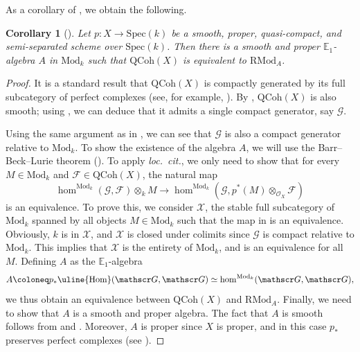 \documentclass[oneside, hidelinks, 12pt, a4paper,reqno]{amsart}
\theoremstyle{plain}
\theoremstyle{definition}
\theoremstyle{plain}
\newtheorem{corollary}[corollary]{Corollary}
\newcommand{\cF}{\mathscr F}
\newcommand{\cG}{\mathscr G}
\newcommand{\cO}{\mathscr O}
\newcommand{\cX}{\mathscr X}
\newcommand{\Spec}{\mathrm{Spec}}
\newcommand{\Qcoh}{\mathrm{QCoh}}
\newcommand{\Hom}{\mathrm{Hom}}
\newcommand{\Mod}{\mathrm{Mod}}
\newcommand{\RMod}{\mathrm{RMod}}
\begin{document}
As a corollary of , we obtain the following.

\begin{corollary}[{\cite{bondal2002generatorsrepresentabilityfunctorscommutative, toen2011derivedazumayaalgebrasgenerators}}]\label{cor: non commutative algebra in alg geo}
    Let $p\colon X \to \Spec(k)$ be a smooth, proper, quasi-compact, and semi-separated scheme over $\Spec(k)$. Then there is a smooth and proper $\mathbb{E}_{1}$-algebra $A$ in $\Mod_{k}$ such that $\Qcoh(X)$ is equivalent to $\mathrm{RMod}_{A}$.
\end{corollary}

\begin{proof}
    It is a standard result that $\Qcoh(X)$ is compactly generated by its full subcategory of perfect complexes (see, for example, \cite[Theorem 8.3]{scholze2025sixfunctorformalisms}). By , $\Qcoh(X)$ is also smooth; using \cite[Proposition 11.3.2.4]{SAG}, we can deduce that it admits a single compact generator, say $\cG$. 
    
    Using the same argument as in , we can see that $\cG$ is also a compact generator relative to $\Mod_{k}$. To show the existence of the algebra $A$, we will use the Barr--Beck--Lurie theorem (\cite[Proposition 4.8.5.8]{HA}). To apply \textit{loc.\ cit.}, we only need to show that for every $M \in \Mod_{k}$ and $\cF \in \Qcoh(X)$, the natural map
    \begin{equation}\label{eq: equivalence for Bar-Back}
    \hom^{\Mod_{k}}(\cG, \cF)\otimes_{k} M \to \hom^{\Mod_{k}}(\cG, p^{\ast}(M)\otimes_{\cO_{X}} \cF) 
    \end{equation}
    is an equivalence. To prove this, we consider $\cX$, the stable full subcategory of $\Mod_{k}$ spanned by all objects $M \in \Mod_{k}$ such that the map in  is an equivalence. Obviously, $k$ is in $\cX$, and $\cX$ is closed under colimits since $\cG$ is compact relative to $\Mod_{k}$. This implies that $\cX$ is the entirety of $\Mod_{k}$, and  is an equivalence for all $M$. Defining $A$ as the $\mathbb{E}_{1}$-algebra
    \[
    A \coloneq p_{\ast}\uline{\Hom}(\cG, \cG) \simeq \hom^{\Mod_{k}}(\cG,\cG),
    \]
    we thus obtain an equivalence between $\Qcoh(X)$ and $\RMod_{A}$. Finally, we need to show that $A$ is a smooth and proper algebra. The fact that $A$ is smooth follows from  and . Moreover, $A$ is proper since $X$ is proper, and in this case $p_{\ast}$ preserves perfect complexes (see \cite[Theorem 8.10]{scholze2025sixfunctorformalisms}).
\end{proof}
\end{document}
